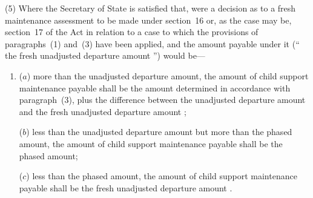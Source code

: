 \documentclass[12pt,a4paper]{article}
\begin{document}
(5) 
Where the Secretary of State is satisfied that, were a decision as to a fresh maintenance assessment to be made under section~16 or, as the case may be, section~17 of the Act  %
in relation to a case to which the provisions of 
paragraphs~(1) and~(3)  %
have been applied, and the amount payable under it (“%
the fresh unadjusted departure amount%
”) would be—
\begin{enumerate}\item[]
($a$) more than the unadjusted departure amount, the amount of child support maintenance payable shall be the amount determined in accordance with paragraph~(3), plus the difference between the unadjusted departure amount and
the fresh unadjusted departure amount%
;

($b$) less than the unadjusted departure amount but more than the phased amount,
the amount of child support maintenance payable shall be the phased amount;

($c$) less than the phased amount, the amount of child support maintenance payable
shall be 
the fresh unadjusted departure amount%
.
\end{enumerate}
\end{document}
